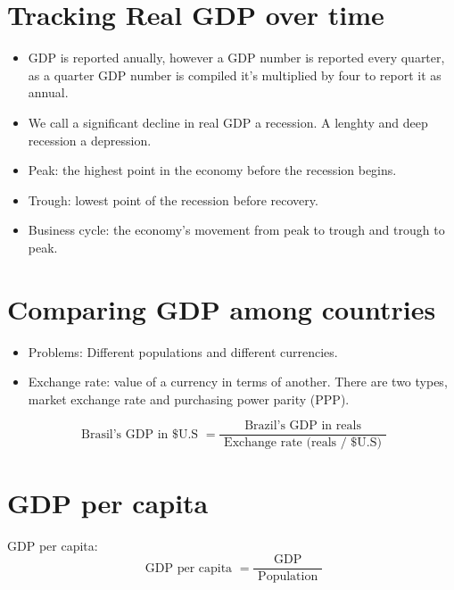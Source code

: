 \documentclass{article}
\begin{document}
\section{Tracking Real GDP over time}
\begin{itemize}
    \item GDP is reported anually, however a GDP number is reported every quarter, as a quarter GDP number is compiled it's multiplied by four to report it as annual.
    \item We call a significant decline in real GDP a recession. A lenghty and deep recession a depression. 
    \item Peak: the highest point in the economy before the recession begins. 
    \item Trough: lowest point of the recession before recovery.
    \item Business cycle: the economy's movement from peak to trough and trough to peak.
\end{itemize}

\section{Comparing GDP among countries}
\begin{itemize}
    \item Problems: Different populations and different currencies.
    \item Exchange rate: value of a currency in terms of another. There are two types, market exchange rate and purchasing power parity (PPP).
\end{itemize}
\[
    \text{ Brasil's GDP in \$ U.S } = \frac{\text{ Brazil's GDP in reals }}{\text{ Exchange rate (reals / \$U.S) }} 
\]



\section{GDP per capita}
GDP per capita: 
\[
  \text{ GDP per capita } = \frac{\text{ GDP }}{\text{ Population }} 
\]

\end{document}
